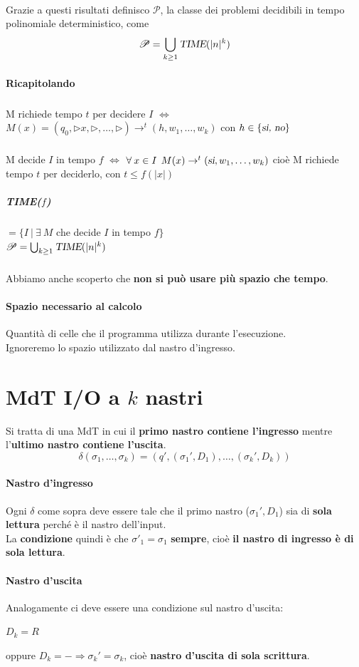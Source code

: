 \documentclass[10pt]{book}
\begin{document}
\paragraph{} Grazie a questi risultati definisco $\mathscr{P}$, la classe dei problemi decidibili in tempo polinomiale deterministico, come $$\mathscr{P} = \bigcup_{k \geq 1} \textsl{TIME}(|n|^k) $$
\paragraph{Ricapitolando}
\subparagraph{} M richiede tempo $t$ per decidere $I$ $\Leftrightarrow$ $M(x) = (q_0, \triangleright x, \triangleright, \ldots, \triangleright) \rightarrow^t (h, w_1, \ldots, w_k)$ con $h \in \{\textsl{si, no}\}$
\subparagraph{} M decide $I$ in tempo $f$ $\Leftrightarrow$ $\forall\:x\in I\:\:M(x) \rightarrow^t (\textsl{si}, w_1, \ldots, w_k)$ cioè M richiede tempo $t$ per deciderlo, con $t \leq f(|x|)$
\subparagraph{TIME($f$)} $=\{I\:|\:\exists\: M$ che decide $I$ in tempo $f\}$\\
$\mathscr{P} = \bigcup_{k \geq 1} \textsl{TIME}(|n|^k)$
\subparagraph{}Abbiamo anche scoperto che \textbf{non si può usare più spazio che tempo}.
\paragraph{Spazio necessario al calcolo} Quantità di celle che il programma utilizza durante l'esecuzione.\\
Ignoreremo lo spazio utilizzato dal nastro d'ingresso.
\section{MdT I/O a $k$ nastri}
Si tratta di una MdT in cui il \textbf{primo nastro contiene l'ingresso} mentre l'\textbf{ultimo nastro contiene l'uscita}.
$$\delta(\sigma_1, \ldots, \sigma_k) = (q', (\sigma_1', D_1), \ldots, (\sigma_k', D_k))$$
\paragraph{Nastro d'ingresso} Ogni $\delta$ come sopra deve essere tale che il primo nastro ($\sigma_1', D_1$) sia di \textbf{sola lettura} perché è il nastro dell'input.\\
La \textbf{condizione} quindi è che $\sigma'_1 = \sigma_1$ \textbf{sempre}, cioè \textbf{il nastro di ingresso è di sola lettura}.
\paragraph{Nastro d'uscita} Analogamente ci deve essere una condizione sul nastro d'uscita:
\begin{list}{}{}
	\item $D_k = R$
	\item oppure $D_k = -\Rightarrow\sigma_k' = \sigma_k$, cioè \textbf{nastro d'uscita di sola scrittura}.
\end{list}
\end{document}
